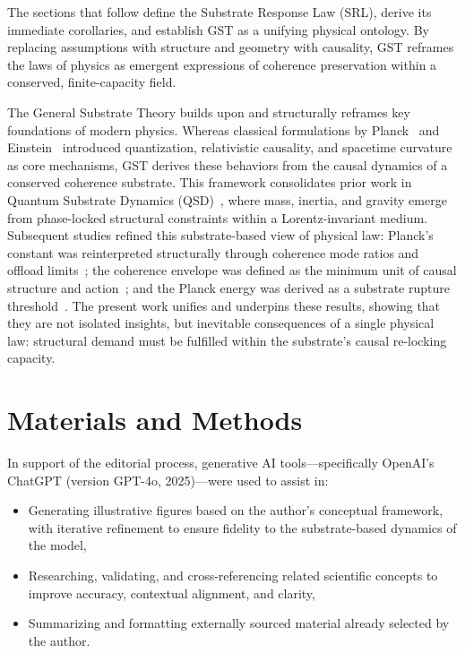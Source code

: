 \documentclass[entropy,article,submit,pdftex,moreauthors]{Definitions/mdpi}
\begin{document}
The sections that follow define the Substrate Response Law (SRL), derive its immediate corollaries, and establish GST as a unifying physical ontology. By replacing assumptions with structure and geometry with causality, GST reframes the laws of physics as emergent expressions of coherence preservation within a conserved, finite-capacity field.

The General Substrate Theory builds upon and structurally reframes key foundations of modern physics. Whereas classical formulations by Planck~\cite{planck1901} and Einstein~\cite{einstein1905,einstein1915} introduced quantization, relativistic causality, and spacetime curvature as core mechanisms, GST derives these behaviors from the causal dynamics of a conserved coherence substrate. This framework consolidates prior work in Quantum Substrate Dynamics (QSD)~\cite{bush2025}, where mass, inertia, and gravity emerge from phase-locked structural constraints within a Lorentz-invariant medium. Subsequent studies refined this substrate-based view of physical law: Planck’s constant was reinterpreted structurally through coherence mode ratios and offload limits~\cite{bush-planck-2025}; the coherence envelope was defined as the minimum unit of causal structure and action~\cite{bush-coherence}; and the Planck energy was derived as a substrate rupture threshold~\cite{bush-planck-ep}. The present work unifies and underpins these results, showing that they are not isolated insights, but inevitable consequences of a single physical law: structural demand must be fulfilled within the substrate’s causal re-locking capacity.



\section{Materials and Methods}
\qsdmethodstatement

In support of the editorial process, generative AI tools—specifically OpenAI's ChatGPT (version GPT-4o, 2025)—were used to assist in:
\begin{itemize}
    \item Generating illustrative figures based on the author’s conceptual framework, with iterative refinement to ensure fidelity to the substrate-based dynamics of the model,
    \item Researching, validating, and cross-referencing related scientific concepts to improve accuracy, contextual alignment, and clarity,
    \item Summarizing and formatting externally sourced material already selected by the author.
\end{itemize}
\end{document}
